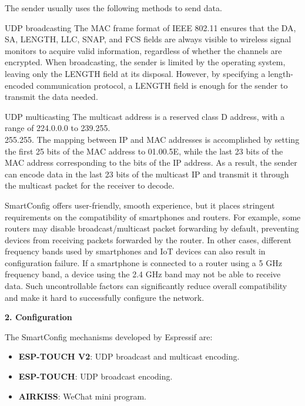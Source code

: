 \documentclass[a4paper,12pt]{book}
\begin{document}
The sender usually uses the following methods to send data.

\begin{term}{UDP broadcasting}
    The MAC frame format of IEEE 802.11 ensures that the DA, SA, LENGTH, LLC, SNAP, and FCS fields are always visible to wireless signal monitors to acquire valid information, regardless of whether the channels are encrypted. When broadcasting, the sender is limited by the operating system, leaving only the LENGTH field at its disposal. However, by specifying a length-encoded communication protocol, a LENGTH field is enough for the sender to transmit the data needed.
\end{term}

\begin{term}{UDP multicasting}
    The multicast address is a reserved class D address, with a range of 224.0.0.0 to 239.255.\\255.255. The mapping between IP and MAC addresses is accomplished by setting the first 25 bits of the MAC address to 01.00.5E, while the last 23 bits of the MAC address corresponding to the bits of the IP address. As a result, the sender can encode data in the last 23 bits of the multicast IP and transmit it through the multicast packet for the receiver to decode.
\end{term}

SmartConfig offers user-friendly, smooth experience, but it places stringent requirements on the compatibility of smartphones and routers. For example, some routers may disable broadcast/multicast packet forwarding by default, preventing devices from receiving packets forwarded by the router. In other cases, different frequency bands used by smartphones and IoT devices can also result in configuration failure. If a smartphone is connected to a router using a 5 GHz frequency band, a device using the 2.4 GHz band may not be able to receive data. Such uncontrollable factors can significantly reduce overall compatibility and make it hard to successfully configure the network.

\textbf{2. Configuration}

The SmartConfig mechanisms developed by Espressif are:

\begin{itemize}
    \item \textbf{ESP-TOUCH V2}: UDP broadcast and multicast encoding.
    \parskip 0pt
    \item \textbf{ESP-TOUCH}: UDP broadcast encoding.
    \item \textbf{AIRKISS}: WeChat mini program.
\end{itemize}
\end{document}
